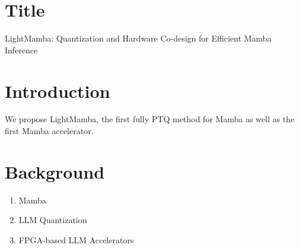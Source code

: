

\section*{Title}
LightMamba: Quantization and Hardware Co-design for Efficient Mamba Inference

\section*{Introduction}

We propose LightMamba, the first fully PTQ method for Mamba as well as the first Mamba accelerator.


\section*{Background}
\begin{enumerate}
    \item Mamba
    \item LLM Quantization
    \item FPGA-based LLM Accelerators

\end{enumerate}



